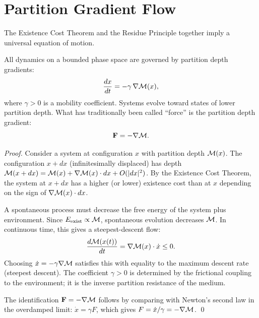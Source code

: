 \section{Partition Gradient Flow}
\label{sec:gradient_flow}

The Existence Cost Theorem and the Residue Principle together imply a universal
equation of motion.

\begin{theorem}
\label{thm:gradient_flow}
All dynamics on a bounded phase space are governed by partition depth gradients:
\begin{equation}
  \frac{dx}{dt} = -\gamma\, \nabla\mathcal{M}(x),
  \label{eq:gradient_flow}
\end{equation}
where $\gamma > 0$ is a mobility coefficient. Systems evolve toward states of
lower partition depth. What has traditionally been called ``force'' is the
partition depth gradient:
\begin{equation}
  \mathbf{F} = -\nabla\mathcal{M}.
  \label{eq:force_as_gradient}
\end{equation}
\end{theorem}

\begin{proof}
Consider a system at configuration $x$ with partition depth $\mathcal{M}(x)$.
The configuration $x + dx$ (infinitesimally displaced) has depth
$\mathcal{M}(x + dx) = \mathcal{M}(x) + \nabla\mathcal{M}(x) \cdot dx + O(|dx|^2)$.
By the Existence Cost Theorem, the system at $x + dx$ has a higher (or lower)
existence cost than at $x$ depending on the sign of $\nabla\mathcal{M}(x) \cdot dx$.

A spontaneous process must decrease the free energy of the system plus
environment. Since $E_{\mathrm{exist}} \propto \mathcal{M}$, spontaneous evolution decreases
$\mathcal{M}$. In continuous time, this gives a steepest-descent flow:
\begin{equation}
  \frac{d\mathcal{M}(x(t))}{dt} = \nabla\mathcal{M}(x) \cdot \dot{x} \leq 0.
\end{equation}
Choosing $\dot{x} = -\gamma\nabla\mathcal{M}$ satisfies this with equality to the
maximum descent rate (steepest descent). The coefficient $\gamma > 0$ is
determined by the frictional coupling to the environment; it is the inverse
partition resistance of the medium.

The identification $\mathbf{F} = -\nabla\mathcal{M}$ follows by comparing with
Newton's second law in the overdamped limit: $\dot{x} = \gamma F$, which gives
$F = \dot{x}/\gamma = -\nabla\mathcal{M}$. \qed
\end{proof}


